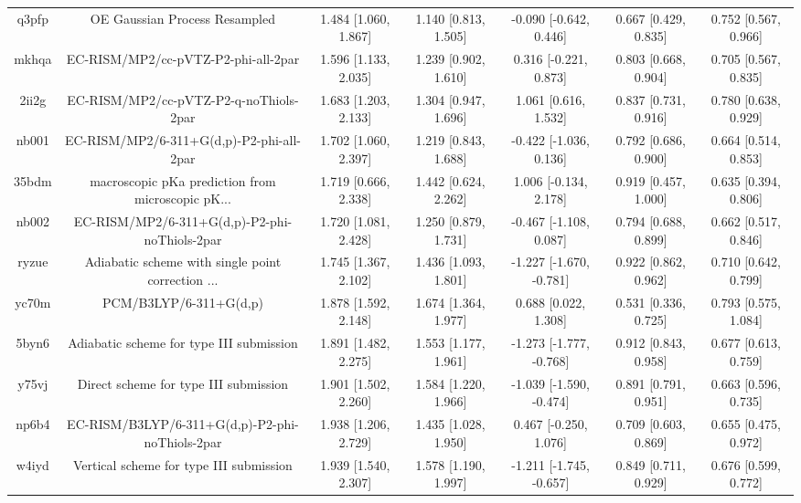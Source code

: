 \documentclass{article}
\begin{document}
\begin{center}
\begin{longtable}{|ccccccc|}
 q3pfp &                      OE Gaussian Process Resampled &  1.484 [1.060, 1.867] &  1.140 [0.813, 1.505] &   -0.090 [-0.642, 0.446] &  0.667 [0.429, 0.835] &   0.752 [0.567, 0.966] \\
 mkhqa &                EC-RISM/MP2/cc-pVTZ-P2-phi-all-2par &  1.596 [1.133, 2.035] &  1.239 [0.902, 1.610] &    0.316 [-0.221, 0.873] &  0.803 [0.668, 0.904] &   0.705 [0.567, 0.835] \\
 2ii2g &             EC-RISM/MP2/cc-pVTZ-P2-q-noThiols-2par &  1.683 [1.203, 2.133] &  1.304 [0.947, 1.696] &     1.061 [0.616, 1.532] &  0.837 [0.731, 0.916] &   0.780 [0.638, 0.929] \\
 nb001 &           EC-RISM/MP2/6-311+G(d,p)-P2-phi-all-2par &  1.702 [1.060, 2.397] &  1.219 [0.843, 1.688] &   -0.422 [-1.036, 0.136] &  0.792 [0.686, 0.900] &   0.664 [0.514, 0.853] \\
 35bdm &  macroscopic pKa prediction from microscopic pK... &  1.719 [0.666, 2.338] &  1.442 [0.624, 2.262] &    1.006 [-0.134, 2.178] &  0.919 [0.457, 1.000] &   0.635 [0.394, 0.806] \\
 nb002 &      EC-RISM/MP2/6-311+G(d,p)-P2-phi-noThiols-2par &  1.720 [1.081, 2.428] &  1.250 [0.879, 1.731] &   -0.467 [-1.108, 0.087] &  0.794 [0.688, 0.899] &   0.662 [0.517, 0.846] \\
 ryzue &  Adiabatic scheme with single point correction ... &  1.745 [1.367, 2.102] &  1.436 [1.093, 1.801] &  -1.227 [-1.670, -0.781] &  0.922 [0.862, 0.962] &   0.710 [0.642, 0.799] \\
 yc70m &                             PCM/B3LYP/6-311+G(d,p) &  1.878 [1.592, 2.148] &  1.674 [1.364, 1.977] &     0.688 [0.022, 1.308] &  0.531 [0.336, 0.725] &   0.793 [0.575, 1.084] \\
 5byn6 &           Adiabatic scheme for type III submission &  1.891 [1.482, 2.275] &  1.553 [1.177, 1.961] &  -1.273 [-1.777, -0.768] &  0.912 [0.843, 0.958] &   0.677 [0.613, 0.759] \\
 y75vj &              Direct scheme for type III submission &  1.901 [1.502, 2.260] &  1.584 [1.220, 1.966] &  -1.039 [-1.590, -0.474] &  0.891 [0.791, 0.951] &   0.663 [0.596, 0.735] \\
 np6b4 &    EC-RISM/B3LYP/6-311+G(d,p)-P2-phi-noThiols-2par &  1.938 [1.206, 2.729] &  1.435 [1.028, 1.950] &    0.467 [-0.250, 1.076] &  0.709 [0.603, 0.869] &   0.655 [0.475, 0.972] \\
 w4iyd &            Vertical scheme for type III submission &  1.939 [1.540, 2.307] &  1.578 [1.190, 1.997] &  -1.211 [-1.745, -0.657] &  0.849 [0.711, 0.929] &   0.676 [0.599, 0.772] \\

\end{longtable}
\end{center}
\end{document}
